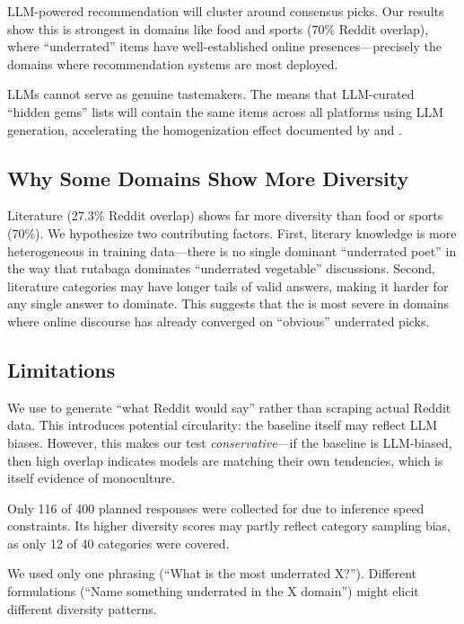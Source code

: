  LLM-powered recommendation will cluster around consensus picks. Our results show this is strongest in domains like food and sports (70\% Reddit overlap), where ``underrated'' items have well-established online presences---precisely the domains where recommendation systems are most deployed.

 LLMs cannot serve as genuine tastemakers. The \noveltyparadox means that LLM-curated ``hidden gems'' lists will contain the same items across all platforms using LLM generation, accelerating the homogenization effect documented by \citet{padmakumar2024diversity} and \citet{anderson2024homogenization}.

\subsection{Why Some Domains Show More Diversity}

Literature (27.3\% Reddit overlap) shows far more diversity than food or sports (70\%). We hypothesize two contributing factors. First, literary knowledge is more heterogeneous in training data---there is no single dominant ``underrated poet'' in the way that rutabaga dominates ``underrated vegetable'' discussions. Second, literature categories may have longer tails of valid answers, making it harder for any single answer to dominate. This suggests that the \noveltyparadox is most severe in domains where online discourse has already converged on ``obvious'' underrated picks.

\subsection{Limitations}
\label{sec:limitations}

 We use \gptfour to generate ``what Reddit would say'' rather than scraping actual Reddit data. This introduces potential circularity: the baseline itself may reflect LLM biases. However, this makes our test \textit{conservative}---if the baseline is LLM-biased, then high overlap indicates models are matching their own tendencies, which is itself evidence of monoculture.

 Only 116 of 400 planned responses were collected for \qwen due to inference speed constraints. Its higher diversity scores may partly reflect category sampling bias, as only 12 of 40 categories were covered.

 We used only one phrasing (``What is the most underrated X?''). Different formulations (\eg ``Name something underrated in the X domain'') might elicit different diversity patterns.

